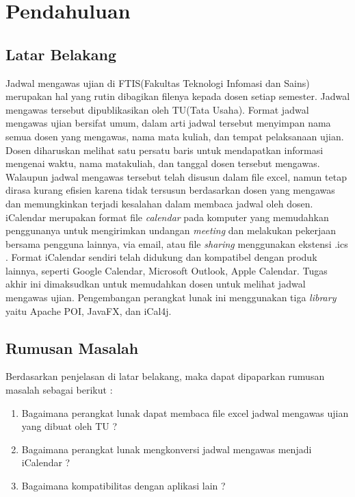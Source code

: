 \chapter{Pendahuluan}
\label{chap:intro}
   
\section{Latar Belakang}
\label{sec:latar_belakang}
\indent Jadwal mengawas ujian di FTIS(Fakultas Teknologi Infomasi dan Sains) merupakan hal yang rutin dibagikan filenya kepada dosen setiap semester. Jadwal mengawas tersebut dipublikasikan oleh TU(Tata Usaha). Format jadwal mengawas ujian bersifat umum, dalam arti jadwal tersebut menyimpan nama semua dosen yang mengawas, nama mata kuliah, dan tempat pelaksanaan ujian. Dosen diharuskan melihat satu persatu baris untuk mendapatkan informasi mengenai waktu, nama matakuliah, dan tanggal dosen tersebut mengawas. Walaupun jadwal mengawas tersebut telah disusun dalam file excel, namun tetap dirasa kurang efisien karena tidak tersusun berdasarkan dosen yang mengawas dan memungkinkan terjadi kesalahan dalam membaca jadwal oleh dosen. 
iCalendar merupakan format file \textit{calendar} pada komputer yang memudahkan penggunanya untuk mengirimkan undangan \textit{meeting} dan melakukan pekerjaan bersama pengguna lainnya, via email, atau file \textit{sharing} menggunakan ekstensi .ics . Format iCalendar sendiri telah didukung dan kompatibel dengan produk lainnya, seperti Google Calendar, Microsoft Outlook, Apple Calendar.
Tugas akhir ini dimaksudkan untuk memudahkan dosen untuk melihat jadwal mengawas ujian. Pengembangan perangkat lunak ini menggunakan tiga \textit{library} yaitu Apache POI, JavaFX, dan iCal4j.    

\section{Rumusan Masalah}
\label{sec:rumusan}
Berdasarkan penjelasan di latar belakang, maka dapat dipaparkan rumusan masalah sebagai berikut :
\begin{enumerate}
	\item Bagaimana perangkat lunak dapat membaca file excel jadwal mengawas ujian yang dibuat oleh TU ?
	\item Bagaimana perangkat lunak mengkonversi jadwal mengawas menjadi iCalendar ? 
	\item Bagaimana kompatibilitas dengan aplikasi lain ? 
\end{enumerate}


